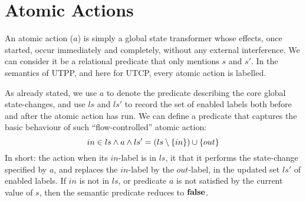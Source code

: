 \section{Atomic Actions}\label{sec:atomic}

An atomic action ($a$) is simply a global state transformer whose effects,
once started,
occur immediately and completely, without any external interference.
We can consider it be a relational predicate that only mentions $s$ and $s'$.
In the semantics of UTPP, and here for UTCP,
every atomic action is labelled.
%

As already stated,
we use $a$ to denote the predicate describing the core global state-changes,
and  use $ls$ and $ls'$ to record the set of enabled labels both before
and after the atomic action has run.
We can define a predicate that captures the basic behaviour
of such ``flow-controlled'' atomic action:
\begin{equation}
  in \in ls
  \land
  a
  \land
  ls'=(ls\setminus\{{in}\})\cup\{{out}\}
  \label{pred:flow-atomic-action}
\end{equation}
In short: the action when its $in$-label is in $ls$,
it that it performs the state-change specified by $a$,
and replaces the $in$-label by the $out$-label,
in the updated set $ls'$ of enabled labels.
If $in$ is not in $ls$,
or predicate $a$ is not satisfied by the current value of $s$,
then the semantic predicate reduces to $\mathbf{false}$.



